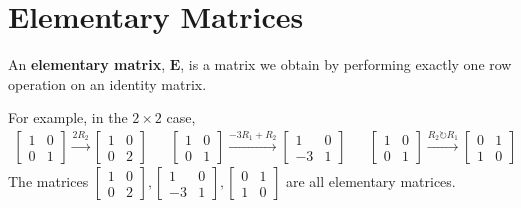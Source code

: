 \documentclass[11pt]{article}
\newcommand{\keyphrase}{\textbf}
\newcommand{\mat}[1]{\mathbf{#1}}
\begin{document}
\section*{Elementary Matrices}

An \keyphrase{elementary matrix}, $\mat{E}$, is a matrix we obtain by performing exactly one row operation on an identity matrix.

For example, in the $2 \times 2$ case,
\begin{align*}
\begin{bmatrix}1 & 0 \\ 0 & 1\end{bmatrix}
\xrightarrow[]{2 R_2}
\begin{bmatrix}1 & 0 \\ 0 & 2\end{bmatrix}
&&
\begin{bmatrix}1 & 0 \\ 0 & 1\end{bmatrix}
\xrightarrow[]{-3 R_1 + R_2}
\begin{bmatrix}1 & 0 \\ -3 & 1\end{bmatrix}
&&
\begin{bmatrix}1 & 0 \\ 0 & 1\end{bmatrix}
\xrightarrow[]{R_2 \circlearrowright R_1}
\begin{bmatrix}0 & 1 \\ 1 & 0\end{bmatrix}
\end{align*}
The matrices $\begin{bmatrix}1 & 0 \\ 0 & 2\end{bmatrix},\begin{bmatrix}1 & 0 \\ -3 & 1\end{bmatrix},\begin{bmatrix}0 & 1 \\ 1 & 0\end{bmatrix}$ are all elementary matrices.
\end{document}

